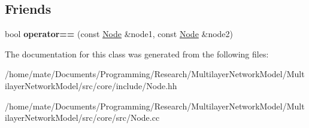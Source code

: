 \subsection*{Friends}
\begin{DoxyCompactItemize}
\item 
bool {\bfseries operator==} (const \hyperlink{classNode}{Node} \&node1, const \hyperlink{classNode}{Node} \&node2)\hypertarget{classNode_aa6ca4e78d2001f10e20ffcf962ef42cb}{}\label{classNode_aa6ca4e78d2001f10e20ffcf962ef42cb}

\end{DoxyCompactItemize}


The documentation for this class was generated from the following files\+:\begin{DoxyCompactItemize}
\item 
/home/mate/\+Documents/\+Programming/\+Research/\+Multilayer\+Network\+Model/\+Multilayer\+Network\+Model/src/core/include/Node.\+hh\item 
/home/mate/\+Documents/\+Programming/\+Research/\+Multilayer\+Network\+Model/\+Multilayer\+Network\+Model/src/core/src/Node.\+cc\end{DoxyCompactItemize}
